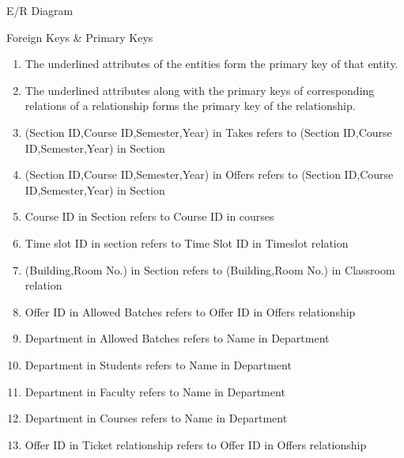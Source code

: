 \documentclass{beamer}
\begin{document}
\begin{frame}{E/R Diagram}
{
} %
\end{frame}

\begin{frame}[allowframebreaks]{Foreign Keys \& Primary Keys}
\begin{enumerate}
\item The underlined attributes of the entities form the primary key of that entity.
\item The underlined attributes along with the primary keys of corresponding relations of a relationship forms the primary key of the relationship.
\item (Section ID,Course ID,Semester,Year) in Takes refers to (Section ID,Course ID,Semester,Year) in Section
\item  (Section ID,Course ID,Semester,Year) in Offers refers to (Section ID,Course ID,Semester,Year) in Section
\item Course ID in Section refers to Course ID in courses
\item Time slot ID in section refers to Time Slot ID in Timeslot relation
\item (Building,Room No.) in Section refers to (Building,Room No.) in Classroom relation
\item Offer ID in Allowed Batches refers to Offer ID in Offers relationship  
\item Department in Allowed Batches refers to Name in Department 
\item Department in Students refers to Name in Department
\item Department in Faculty refers to Name in Department
\item Department in Courses refers to Name in Department
\item Offer ID in Ticket relationship refers to Offer ID in Offers relationship

\end{enumerate}
\end{frame}
\end{document}
